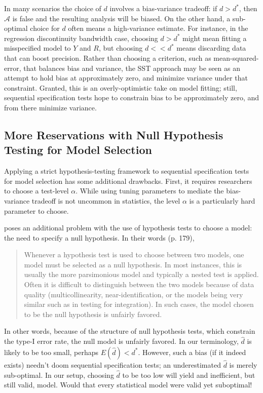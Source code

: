 \documentclass[lineno]{biometrika}\usepackage[]{graphicx}\usepackage[]{color}
\newcommand{\dstar}{d^*}
\newcommand{\EE}{E}
\begin{document}
In many scenarios the choice of $d$ involves a bias-variance tradeoff:
if $d>\dstar$, then $\mathcal{A}$ is false and the resulting analysis
will be biased.
On the other hand, a sub-optimal choice for $d$ often means a
high-variance estimate.
For instance, in the regression discontinuity bandwidth case, choosing $d>\dstar$ might mean
fitting a misspecified model to $Y$ and $R$, but choosing $d<<\dstar$
means discarding data that can boost precision.
Rather than choosing a criterion, such as mean-squared-error, that
balances bias and variance, the SST approach may be seen as an attempt to hold
bias at approximately zero, and minimize variance under that
constraint.
Granted, this is an overly-optimistic take on model fitting;
still, sequential specification tests hope to constrain bias to be approximately zero, and from there
minimize variance.


\subsection{More Reservations with Null Hypothesis Testing for Model
  Selection}

Applying a strict hypothesis-testing framework to sequential specification tests for model
selection has some additional drawbacks.
First, it requires researchers to choose a test-level $\alpha$. While
using tuning parameters to mediate the bias-variance tradeoff is not
uncommon in statistics, the level $\alpha$ is a particularly hard
parameter to choose.

\citet{granger} poses an additional problem with the use of
hypothesis tests to choose a model: the need to specify a null
hypothesis. In their words (p. 179),
\begin{quote}
Whenever a hypothesis test is used to choose between two models, one
model must be selected as a null hypothesis. In most instances, this
is usually the more parsimonious model and typically a nested test is
applied. Often it is difficult to distinguish between the two models
because of data quality (multicollinearity, near-identification, or
the models being very similar such as in testing for integration). In
such cases, the model chosen to be the null hypothesis is unfairly
favored.
\end{quote}
In other words, because of the structure of null hypothesis tests,
which constrain the type-I error rate, the null model is unfairly
favored.
In our terminology, $\hat{d}$ is likely to be too small, perhaps $\EE
(\hat{d})<\dstar$.
However, such a bias (if it indeed exists) needn't doom sequential specification tests; an
underestimated $\hat{d}$ is merely sub-optimal. In our setup, choosing
$\hat{d}$ to be too low will yield and inefficient, but still valid,
model.
Would that every statistical model were valid yet suboptimal!
\end{document}

